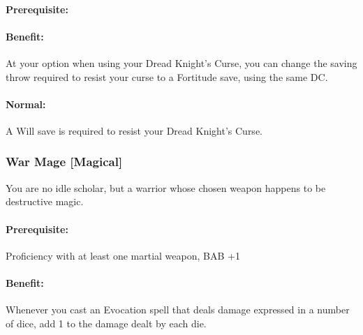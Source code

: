 \paragraph{Prerequisite:} 
\paragraph{Benefit:} At your option when using your Dread Knight's Curse, you can change the saving throw required to resist your curse to a Fortitude save, using the same DC.
\paragraph{Normal:} A Will save is required to resist your Dread Knight's Curse.

\subsubsection[War Mage]{War Mage [Magical]}
\label{Feat:WarMage}
You are no idle scholar, but a warrior whose chosen weapon happens to be destructive magic.

\paragraph{Prerequisite:} Proficiency with at least one martial weapon, BAB +1

\paragraph{Benefit:} Whenever you cast an Evocation spell that deals damage expressed in a number of dice, add 1 to the damage dealt by each die. 